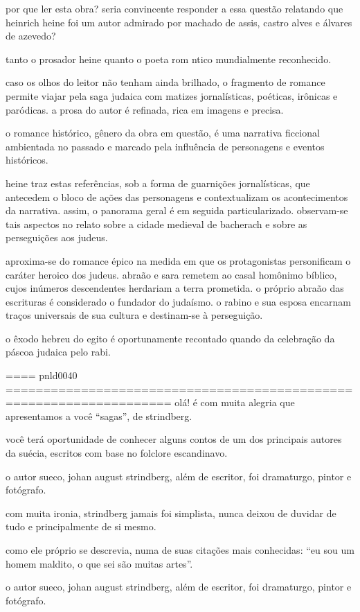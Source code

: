 por que ler esta obra? seria convincente responder a essa questão relatando que heinrich heine foi um autor admirado por machado de assis, castro alves e álvares de azevedo?

tanto o prosador heine quanto o poeta rom ntico mundialmente reconhecido.

caso os olhos do leitor não tenham ainda brilhado, o fragmento de romance permite viajar pela saga judaica com matizes jornalísticas, poéticas, irônicas e paródicas. a prosa do autor é refinada, rica em imagens e precisa.


o romance histórico, gênero da obra em questão, é uma narrativa ficcional ambientada no passado e marcado pela influência de personagens e eventos históricos.

heine traz estas referências, sob a forma de guarnições jornalísticas, que antecedem o bloco de ações das personagens e contextualizam os acontecimentos da narrativa. assim, o panorama geral é em seguida particularizado.  observam-se tais aspectos no relato sobre a cidade medieval de bacherach e sobre as perseguições aos judeus.

aproxima-se do romance épico na medida em que os protagonistas personificam o caráter heroico dos judeus. abraão e sara remetem ao casal homônimo bíblico, cujos inúmeros descendentes herdariam a terra prometida. o próprio abraão das escrituras é considerado o fundador do judaísmo. o rabino e sua esposa encarnam traços universais de sua cultura e destinam-se à perseguição.

o êxodo hebreu do egito é oportunamente recontado quando da celebração da páscoa judaica pelo rabi.


==== pnld0040 ====================================================================
olá! é com muita alegria que apresentamos a você “sagas”, de strindberg.

você terá oportunidade de conhecer alguns contos de um dos principais autores da suécia, escritos com base no folclore escandinavo.


o autor sueco, johan august strindberg, além de escritor, foi dramaturgo, pintor e fotógrafo.

com muita ironia, strindberg jamais foi simplista, nunca deixou de duvidar de tudo e principalmente de si mesmo.

como ele próprio se descrevia, numa de suas citações mais conhecidas: “eu sou um homem maldito, o que sei são muitas artes”.

o autor sueco, johan august strindberg, além de escritor, foi dramaturgo, pintor e fotógrafo.

